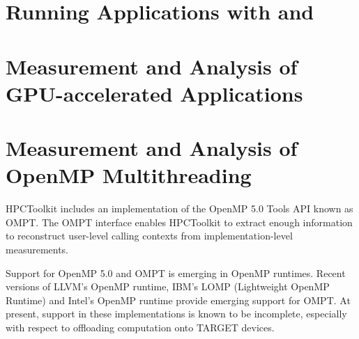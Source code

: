 \documentclass[11pt,letterpaper]{report}
\begin{document}

\chapter{Running Applications with \hpcrun{} and \hpclink{}}
\label{chpt:hpcrun}





\chapter{Measurement and Analysis of GPU-accelerated Applications}
\label{chpt:gpu}

{
\centering
 \vspace{2ex}
}






\chapter{Measurement and Analysis of OpenMP Multithreading}
\label{chpt:gpu}

{
\centering
 \vspace{2ex}
}

HPCToolkit includes an implementation of the OpenMP 5.0 Tools API known as OMPT. The OMPT interface enables HPCToolkit to extract enough information to reconstruct user-level calling contexts from implementation-level measurements. 

Support for OpenMP 5.0 and OMPT is emerging in OpenMP runtimes. Recent versions of LLVM's OpenMP runtime, IBM's LOMP (Lightweight OpenMP Runtime) and Intel's OpenMP runtime provide emerging support for OMPT. At present, support in these implementations is known to be incomplete, especially with respect to offloading computation onto TARGET devices. 
\end{document}
